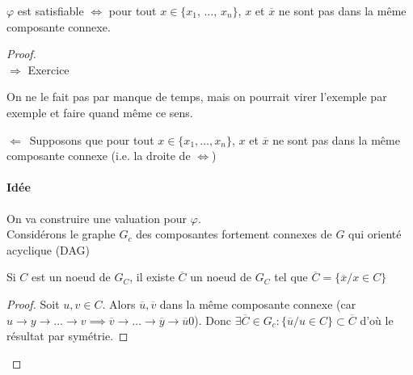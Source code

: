 \begin{proposition}
	$\varphi$ est satisfiable $\Leftrightarrow$ pour tout $x\in \{x_1, \, \dots, \, x_n\}$, $x$ et $\overline x$ ne sont pas dans la même composante connexe.
\end{proposition}

\begin{proof} \enspace \\
	
	$\boxed{\Rightarrow}$ Exercice
	 \begin{com}
	 	On ne le fait pas par manque de temps, mais on pourrait virer l'exemple par exemple et faire quand même ce sens.
	 \end{com}
	
	$\boxed{\Leftarrow}$ Supposons que pour tout $x\in \{x_1, \dots, x_n\}$, $x$ et $\overline x$ ne sont pas dans la même composante connexe (i.e. la droite de $\Leftrightarrow$)
	\paragraph{Idée} On va construire une valuation pour $\varphi$.\\
	
	Considérons le graphe $G_c$ des composantes fortement connexes de $G$ qui orienté acyclique (DAG)
	
	\begin{example}
	\end{example}

	\begin{lemma}
		Si $C$ est un noeud de $G_C$, il existe $\overline C$ un noeud de $G_C$ tel que $\overline C = \{\overline x / x \in C\}$
	\end{lemma}

	\begin{proof}
		Soit $u,v \in C$. Alors $\overline u, \overline v$ dans la même composante connexe (car $u\to y \to \dots \to v \implies \overline v \to \dots \to \overline y \to \overline u0$). Donc $\exists \overline C \in G_c : \{\overline u / u \in C\} \subset \overline C$ d'où le résultat par symétrie.
	\end{proof}
	

\end{proof}
